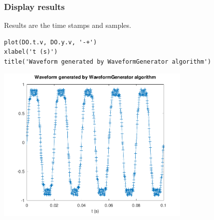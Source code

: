 {}
\subsubsection*{Display results}



Results are the time stamps and samples.

\begin{lstlisting}
plot(DO.t.v, DO.y.v, '-+')
xlabel('t (s)')
title('Waveform generated by WaveformGenerator algorithm')
\end{lstlisting}
\begin{center}
\includegraphics[width=0.7\textwidth]{algs_examples_published/WaveformGenerator_alg_example-1.pdf}
\end{center}


\stopcontents[localtoc]
